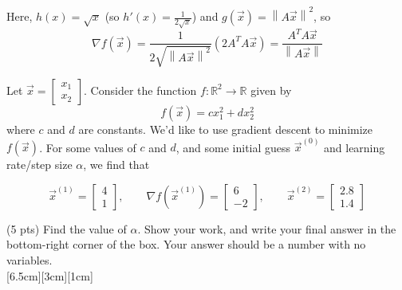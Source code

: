 \documentclass[11pt]{article}
\begin{document}
\begin{prob}[(12 pts)]
\begin{subprob}
\begin{solution}
Here, $h(x) = \sqrt{x}$ (so $h'(x) = \displaystyle \frac{1}{2\sqrt{x}}$) and $g(\vec x) = \left\|A\vec x\right\|^2$, so
\[
\nabla f(\vec x)
=
\frac{1}{2\sqrt{\left\|A\vec x\right\|^2}}
\left( 2A^TA\vec x \right)
=
\frac{A^TA\vec x}{\left\|A\vec x\right\|}
\]
\end{solution}

\end{subprob}



\end{prob}

\newpage

\begin{prob}[(15 pts)]
Let $\vec x = \begin{bmatrix} x_1 \\ x_2 \end{bmatrix}$. Consider the function $f: \mathbb{R}^2 \to \mathbb{R}$ given by
$$f(\vec x) = c x_1^2 + d x_2^2$$
where $c$ and $d$ are constants. We'd like to use gradient descent to minimize $f(\vec x)$. For some values of $c$ and $d$, and some initial guess $\vec x^{(0)}$ and learning rate/step size $\alpha$, we find that

$$\vec x^{(1)} = \begin{bmatrix} 4 \\ 1 \end{bmatrix}, \qquad \nabla f(\vec x^{(1)}) = \begin{bmatrix} 6 \\ -2 \end{bmatrix}, \qquad \vec x^{(2)} = \begin{bmatrix} 2.8 \\ 1.4 \end{bmatrix}$$
\begin{subprob}(5 pts)
Find the value of $\alpha$. Show your work, and write your final answer in the bottom-right corner of the box. Your answer should be a number with no variables. \\

[6.5cm][3cm][1cm]


\end{subprob}
\end{prob}
\end{document}
